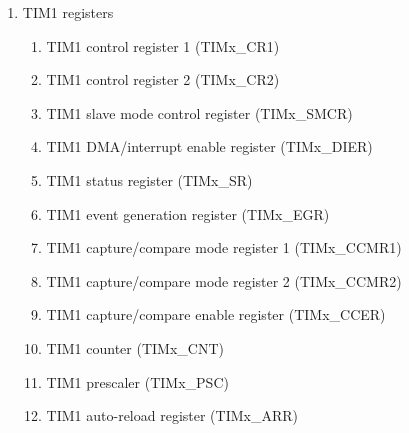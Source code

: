 \documentclass{article}
\begin{document}
\begin{enumerate}
\begin{enumerate}
\begin{enumerate}
            \item Complementary outputs and dead-time insertion 
            \item Using the break function 
            \item Clearing the OCxREF signal on an external event 
            \item 6-step PWM generation 
            \item One-pulse mode 
            \item Encoder interface mode 
            \item Timer input XOR function 
            \item Interfacing with Hall sensors 
            \item TIMx and external trigger synchronization 
            \item Timer synchronization 
            \item Debug mode 
        \end{enumerate}
        \item TIM1 registers 
        \begin{enumerate}
            \item TIM1 control register 1 (TIMx\_CR1) 
            \item TIM1 control register 2 (TIMx\_CR2) 
            \item TIM1 slave mode control register (TIMx\_SMCR) 
            \item TIM1 DMA/interrupt enable register (TIMx\_DIER) 
            \item TIM1 status register (TIMx\_SR) 
            \item TIM1 event generation register (TIMx\_EGR) 
            \item TIM1 capture/compare mode register 1 (TIMx\_CCMR1) 
            \item TIM1 capture/compare mode register 2 (TIMx\_CCMR2) 
            \item TIM1 capture/compare enable register (TIMx\_CCER) 
            \item TIM1 counter (TIMx\_CNT) 
            \item TIM1 prescaler (TIMx\_PSC) 
            \item TIM1 auto-reload register (TIMx\_ARR) 

\end{enumerate}
\end{enumerate}
\end{enumerate}
\end{document}
